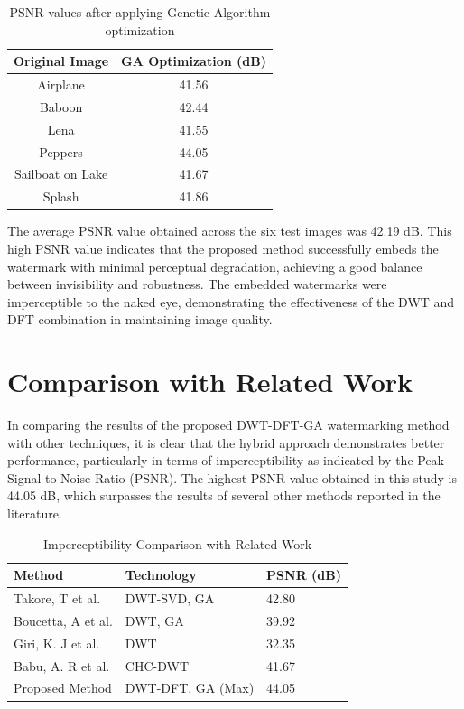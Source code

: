 \begin{table}[H]
\centering
\begin{tabular}{|c|c|}
\hline
\textbf{Original Image} & \textbf{GA Optimization (dB)} \\
\hline
Airplane & 41.56 \\
\hline
Baboon & 42.44 \\
\hline
Lena & 41.55 \\
\hline
Peppers & 44.05 \\
\hline
Sailboat on Lake & 41.67 \\
\hline
Splash & 41.86 \\
\hline
\end{tabular}
\caption{PSNR values after applying Genetic Algorithm optimization}
\label{tab:results2}
\end{table}

The average PSNR value obtained across the six test images was 42.19 dB. This high PSNR value indicates that the proposed method successfully embeds the watermark with minimal perceptual degradation, achieving a good balance between invisibility and robustness. The embedded watermarks were imperceptible to the naked eye, demonstrating the effectiveness of the DWT and DFT combination in maintaining image quality.

\section{Comparison with Related Work}

In comparing the results of the proposed DWT-DFT-GA watermarking method with other techniques, it is clear that the hybrid approach demonstrates better performance, particularly in terms of imperceptibility as indicated by the Peak Signal-to-Noise Ratio (PSNR). The highest PSNR value obtained in this study is 44.05 dB, which surpasses the results of several other methods reported in the literature.

\begin{table}[H]
\centering
\begin{tabular}{|p{3cm}|p{2.5cm}|p{2cm}|}
\hline
\textbf{Method} & \textbf{Technology} & \textbf{PSNR (dB)} \\
\hline
Takore, T et al. & DWT-SVD, GA & 42.80 \\
\hline
Boucetta, A et al. & DWT, GA & 39.92 \\
\hline
Giri, K. J et al. & DWT & 32.35 \\
\hline
Babu, A. R et al. & CHC-DWT & 41.67 \\
\hline
Proposed Method & DWT-DFT, GA (Max) & 44.05 \\
\hline
\end{tabular}
\caption{Imperceptibility Comparison with Related Work}
\label{tab:comparison}
\end{table}

